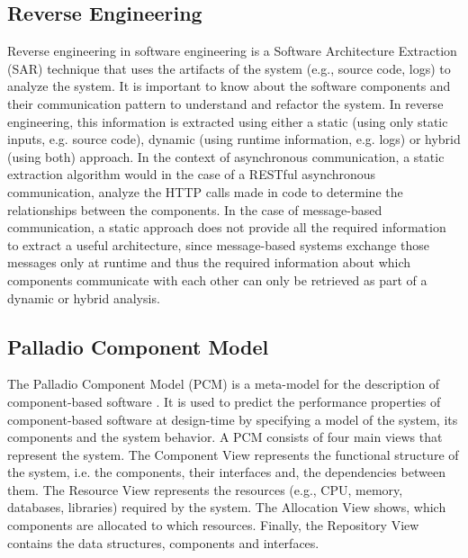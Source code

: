 \subsection{Reverse Engineering}
\label{sec:Foundation:SAR}
Reverse engineering in software engineering is a Software Architecture Extraction (SAR) technique that uses the artifacts of the system (e.g., source code, logs) to analyze the system.
It is important to know about the software components and their communication pattern to understand and refactor the system.
In reverse engineering, this information is extracted using either a static (using only static inputs, e.g. source code), dynamic (using runtime information, e.g. logs) or hybrid (using both) approach.
In the context of asynchronous communication, a static extraction algorithm would in the case of a RESTful asynchronous communication, analyze the HTTP calls made in code to determine the relationships between the components.
In the case of message-based communication, a static approach does not provide all the required information to extract a useful architecture, since message-based systems exchange those messages only at runtime and thus the required information about which components communicate with each other can only be retrieved as part of a dynamic or hybrid analysis. \cite{Singh2021,Mayer2018}


\subsection{Palladio Component Model}
\label{sec:Foundation:PCM}
The Palladio Component Model (PCM) is a meta-model for the description of component-based software \cite{Becker2008}.
It is used to predict the performance properties of component-based software at design-time by specifying a model of the system, its components and the system behavior.
A PCM consists of four main views that represent the system.
The Component View represents the functional structure of the system, i.e. the components, their interfaces and, the dependencies between them.
The Resource View represents the resources (e.g., CPU, memory, databases, libraries) required by the system.
The Allocation View shows, which components are allocated to which resources.
Finally, the Repository View contains the data structures, components and interfaces. \cite{Becker2008}
